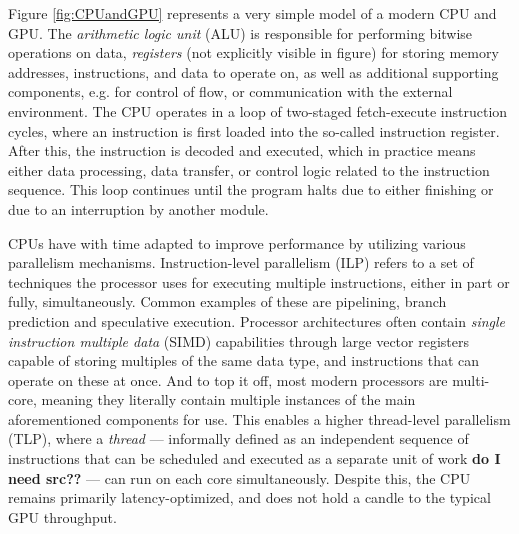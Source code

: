 \documentclass[english,12pt,a4paper,pdftex,sci,utf8]{aaltothesis}
\begin{document}
Figure \ref{fig:CPUandGPU} represents a very simple model of a modern CPU and GPU. The \emph{arithmetic logic unit} (ALU) is responsible for performing bitwise operations on data, \emph{registers} (not explicitly visible in figure) for storing memory addresses, instructions, and data to operate on, as well as additional supporting components, e.g. for control of flow, or communication with the external environment. The CPU operates in a loop of two-staged fetch-execute instruction cycles, where an instruction is first loaded into the so-called instruction register. After this, the instruction is decoded and executed, which in practice means either data processing, data transfer, or control logic related to the instruction sequence. This loop continues until the program halts due to either finishing or due to an interruption by another module.\cite{stallings2011operating}

CPUs have with time adapted to improve performance by utilizing various parallelism mechanisms. Instruction-level parallelism (ILP) refers to a set of techniques the processor uses for executing multiple instructions, either in part or fully, simultaneously. Common examples of these are pipelining, branch prediction and speculative execution. Processor architectures often contain \emph{single instruction multiple data} (SIMD) capabilities through large vector registers capable of storing multiples of the same data type, and instructions that can operate on these at once. And to top it off, most modern processors are multi-core, meaning they literally contain multiple instances of the main aforementioned components for use. This enables a higher thread-level parallelism (TLP), where a \emph{thread} — informally defined as an independent sequence of instructions that can be scheduled and executed as a separate unit of work \textbf{do I need src??} — can run on each core simultaneously. Despite this, the CPU remains primarily latency-optimized, and does not hold a candle to the typical GPU throughput. \cite{hennessy2011computer}
\end{document}
